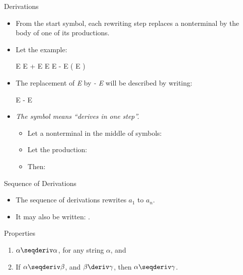 \begin{bibunit}[apalike]
\begin{frame}{Derivations}
	\begin{itemize}
	\item From the start symbol, each rewriting step replaces a nonterminal by the body of one of its productions.
	\vfill
	\item Let the example:
		\begin{center}\bnfstyle
			E \bnfbody E \tok+ E \bnfor E \tok* E \bnfor \tok- E \bnfor \tok( E \tok) \bnfor \tok{id}
		\end{center}
	\item The replacement of \textit{E} by \textit{\tok- E} will be described by writing:
		\begin{center}\bnfstyle
			E \deriv \tok- E
		\end{center}
	\item \emph{The symbol \deriv means ``derives in one step''.}
	\begin{example}
		\begin{itemize}
		\item Let a nonterminal  in the middle of symbols: 
		\item Let the production: 
		\item Then: 
		\end{itemize}
	\end{example}
	\end{itemize}
\end{frame}

\begin{frame}{Sequence of Derivations}
	\begin{definition}
		\begin{itemize}
		\item The sequence of derivations  rewrites $a_1$ to $a_n$.
		\item It may also be written: .
		\end{itemize}
	\end{definition}
	\begin{block}{Properties}
		\begin{enumerate}
		\item $\alpha\seqderiv\alpha$, for any string $\alpha$, and
		\item If $\alpha\seqderiv\beta$, and $\beta\deriv\gamma$, then $\alpha\seqderiv\gamma$.
		\end{enumerate}
	\end{block}
\end{frame}


\end{bibunit}
